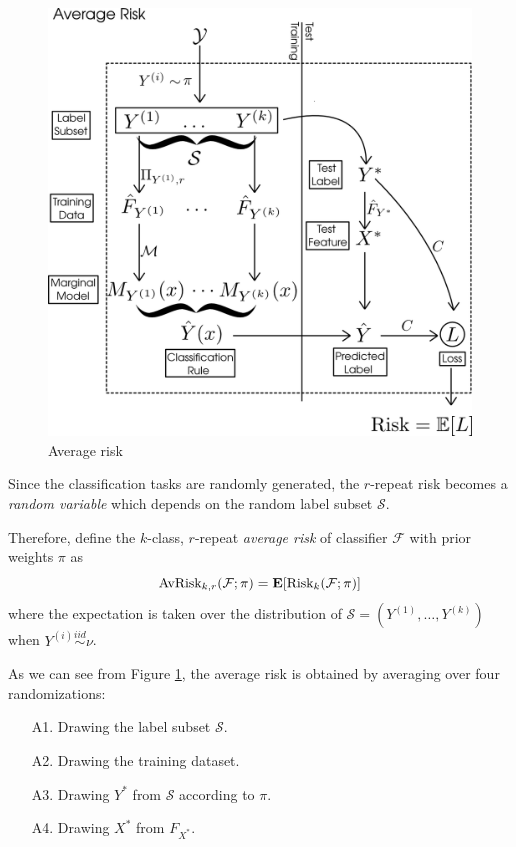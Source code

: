 \documentclass[12pt]{article}
\begin{document}
\begin{figure}[h]
\centering
\includegraphics[scale = 0.3]{extrapolation_figures/average_risk.png}
\caption{Average risk}\label{fig:average_risk}
\end{figure}


Since the classification tasks are randomly generated, the $r$-repeat
risk becomes a \emph{random variable} which depends on the random
label subset $\mathcal{S}$.

Therefore, define the $k$-class, $r$-repeat \emph{average risk} of
classifier $\mathcal{F}$ with prior weights $\pi$ as
\[
\text{AvRisk}_{k, r}(\mathcal{F}; \pi) = \textbf{E}[\text{Risk}_k(\mathcal{F}; \pi)]
\]
where the expectation is taken over the distribution of $\mathcal{S} =
(Y^{(1)},\hdots, Y^{(k)})$ when $Y^{(i)} \stackrel{iid}{\sim} \nu$.

As we can see from Figure \ref{fig:average_risk}, the average risk is obtained by averaging
over four randomizations:
\begin{enumerate}
\item[A1.] Drawing the label subset $\mathcal{S}$.
\item[A2.] Drawing the training dataset.
\item[A3.] Drawing $Y^*$ from $\mathcal{S}$ according to $\pi$.
\item[A4.] Drawing $X^*$ from $F_{X^*}$.
\end{enumerate}
\end{document}

